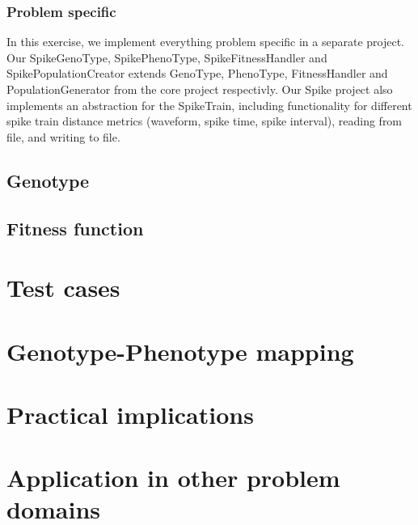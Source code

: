 \documentclass[12pt]{article}
\begin{document}
		\subsubsection{Problem specific}\label{sec:specific}
				In this exercise, we implement everything problem specific in a separate project. Our SpikeGenoType, SpikePhenoType, SpikeFitnessHandler and SpikePopulationCreator extends GenoType, PhenoType, FitnessHandler and PopulationGenerator from the core project respectivly.
		Our Spike project also implements an abstraction for the SpikeTrain, including functionality for different spike train distance metrics (waveform, spike time, spike interval), reading from file, and writing to file.
	\subsection{Genotype}\label{sec:geno}
	\subsection{Fitness function}\label{sec:fitness}
\section{Test cases}\label{sec:test}
\section{Genotype-Phenotype mapping}\label{sec:mapping}
\section{Practical implications}\label{sec:implications}
\section{Application in other problem domains}\label{sec:applications}
\end{document}
